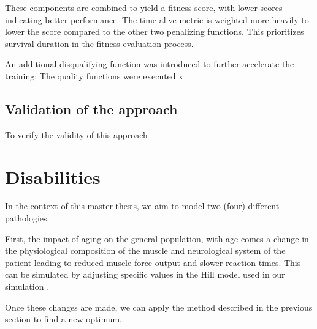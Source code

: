 \documentclass{article}
\begin{document}
These components are combined to yield a fitness score, with lower scores indicating better performance. The time alive metric is weighted more heavily to lower the score compared to the other two penalizing functions. This prioritizes survival duration in the fitness evaluation process.

An additional disqualifying function was introduced to further accelerate the training: The quality functions were executed x
\subsection{Validation of the approach}

To verify the validity of this approach

\section{Disabilities}

In the context of this master thesis, we aim to model two (four) different pathologies.

First, the impact of aging on the general population, with age comes a change in the physiological composition of the muscle and neurological system of the patient leading to reduced muscle force output and slower reaction times.
This can be simulated by adjusting specific values in the Hill model used in our simulation \cite{hillaging}.

Once these changes are made, we can apply the method described in the previous section to find a new optimum.
\newpage



\end{document}
